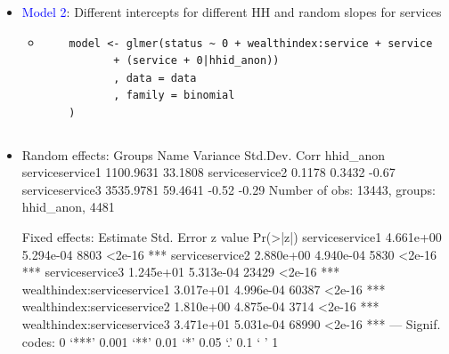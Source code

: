 \documentclass{beamer}
\begin{document}
\begin{frame}[fragile]
\begin{itemize}[<+->]
\item \textcolor{blue}{Model 2}: Different intercepts for different HH and random slopes for services

\begin{itemize}[<+->]
\item[]
\tiny{
\begin{verbatim}
	model <- glmer(status ~ 0 + wealthindex:service + service 
		   + (service + 0|hhid_anon))
		   , data = data
		   , family = binomial
	)
\end{verbatim}
}
\end{itemize}
\item[]
\begin{columns}[t]
\vspace{-4.7cm}
\begin{verbbox}
Random effects:
 Groups    Name            Variance  Std.Dev. Corr       
 hhid_anon serviceservice1 1100.9631 33.1808             
           serviceservice2    0.1178  0.3432  -0.67      
           serviceservice3 3535.9781 59.4641  -0.52 -0.29
Number of obs: 13443, groups:  hhid_anon, 4481

Fixed effects:
                             Estimate Std. Error z value Pr(>|z|)    
serviceservice1             4.661e+00  5.294e-04    8803   <2e-16 ***
serviceservice2             2.880e+00  4.940e-04    5830   <2e-16 ***
serviceservice3             1.245e+01  5.313e-04   23429   <2e-16 ***
wealthindex:serviceservice1 3.017e+01  4.996e-04   60387   <2e-16 ***
wealthindex:serviceservice2 1.810e+00  4.875e-04    3714   <2e-16 ***
wealthindex:serviceservice3 3.471e+01  5.031e-04   68990   <2e-16 ***
---
Signif. codes:  0 ‘***’ 0.001 ‘**’ 0.01 ‘*’ 0.05 ‘.’ 0.1 ‘ ’ 1


\end{verbbox}
\end{columns}
\end{itemize}
\end{frame}
\end{document}
